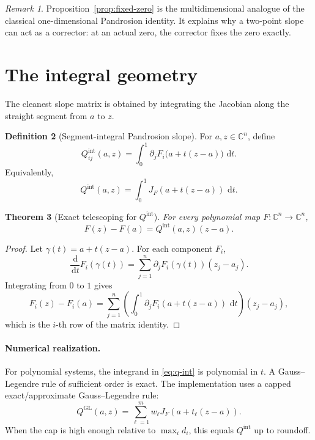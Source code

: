 \documentclass[11pt,a4paper]{article}
\theoremstyle{definition}
\newtheorem{definition}{Definition}[section]
\theoremstyle{plain}
\newtheorem{theorem}[definition]{Theorem}
\theoremstyle{remark}
\newtheorem{remark}[definition]{Remark}
\newcommand{\C}{\mathbb C}
\newcommand{\dd}{\,\mathrm d}
\begin{document}
\begin{remark}
Proposition~\ref{prop:fixed-zero} is the multidimensional analogue of the
classical one-dimensional Pandrosion identity.  It explains why a two-point
slope can act as a corrector: at an actual zero, the corrector fixes the zero
exactly.
\end{remark}

\section{The integral geometry}

The cleanest slope matrix is obtained by integrating the Jacobian along the
straight segment from \(a\) to \(z\).

\begin{definition}[Segment-integral Pandrosion slope]
\label{def:integral-slope}
For \(a,z\in\C^n\), define
\begin{equation}
  \label{eq:q-int}
  Q^{\mathrm{int}}_{ij}(a,z)
  =
  \int_0^1
  \partial_jF_i\bigl(a+t(z-a)\bigr)\,\dd t.
\end{equation}
Equivalently,
\[
  Q^{\mathrm{int}}(a,z)
  =
  \int_0^1 J_F(a+t(z-a))\,\dd t.
\]
\end{definition}

\begin{theorem}[Exact telescoping for \(Q^{\mathrm{int}}\)]
\label{thm:int-telescope}
For every polynomial map \(F:\C^n\to\C^n\),
\[
  F(z)-F(a)=Q^{\mathrm{int}}(a,z)(z-a).
\]
\end{theorem}

\begin{proof}
Let \(\gamma(t)=a+t(z-a)\).  For each component \(F_i\),
\[
  \frac{\dd}{\dd t}F_i(\gamma(t))
  =
  \sum_{j=1}^n
  \partial_jF_i(\gamma(t))(z_j-a_j).
\]
Integrating from \(0\) to \(1\) gives
\[
  F_i(z)-F_i(a)
  =
  \sum_{j=1}^n
  \left(\int_0^1\partial_jF_i(a+t(z-a))\,\dd t\right)(z_j-a_j),
\]
which is the \(i\)-th row of the matrix identity.
\end{proof}

\paragraph{Numerical realization.}
For polynomial systems, the integrand in \eqref{eq:q-int} is polynomial in
\(t\).  A Gauss--Legendre rule of sufficient order is exact.  The implementation
uses a capped exact/approximate Gauss--Legendre rule:
\[
  Q^{\mathrm{GL}}(a,z)
  =
  \sum_{\ell=1}^m w_\ell J_F(a+t_\ell(z-a)).
\]
When the cap is high enough relative to \(\max_i d_i\), this equals
\(Q^{\mathrm{int}}\) up to roundoff.
\end{document}
